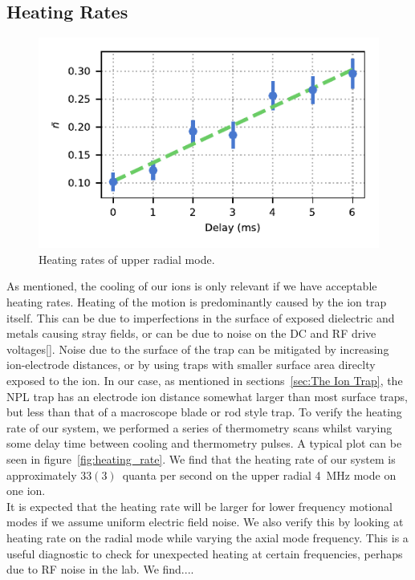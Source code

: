 \documentclass[12pt]{report}
\begin{document}
\subsection{Heating Rates}
\label{sec:Heating}
    \begin{figure}
        \begin{center}
        \noindent\includegraphics[width=\linewidth]{
            figures/pdf_figure/heating_rate.pdf
            }
        \end{center}
        \caption{
            Heating rates of upper radial mode.
            }
        \label{fig:heating rates}
    \end{figure}

    As mentioned, the cooling of our ions is only relevant if we have acceptable
    heating rates. Heating of the motion is predominantly caused by the ion trap
    itself. This can be due to imperfections in the surface of exposed
    dielectric and metals causing stray fields, or can be due to noise on the DC
    and RF drive voltages[]. Noise due to the surface of the trap can be
    mitigated by increasing ion-electrode distances, or by using traps with
    smaller surface area direclty exposed to the ion. In our case, as mentioned
    in sections~\ref{sec:The Ion Trap}, the NPL trap has an electrode ion
    distance somewhat larger than most surface traps, but less than that of a
    macroscope blade or rod style trap. To verify the heating rate of our
    system, we performed a series of thermometry scans whilst varying some delay
    time between cooling and thermometry pulses. A typical plot can be seen in
    figure~\ref{fig:heating_rate}. We find that the heating rate of our system
    is approximately $33(3)$~quanta per second on the upper radial 4~MHz mode on
    one ion.\\
    It is expected that the heating rate will be larger for lower frequency
    motional modes if we assume uniform electric field noise. We also verify
    this by looking at heating rate on the radial mode while varying the axial
    mode frequency. This is a useful diagnostic to check for unexpected heating
    at certain frequencies, perhaps due to RF noise in the lab. We find....\\
\end{document}
